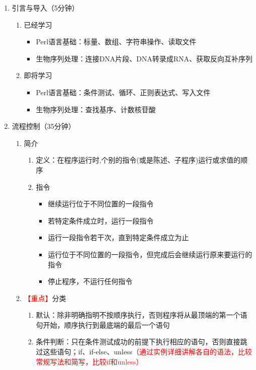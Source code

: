 \documentclass{TIJMUjiaoanLL}
\begin{document}
\begin{enumerate}
  \item 引言与导入（5分钟）
    \begin{enumerate}
      \item 已经学习
	\begin{itemize}
	  \item Perl语言基础：标量、数组、字符串操作、读取文件
	  \item 生物序列处理：连接DNA片段、DNA转录成RNA、获取反向互补序列
	\end{itemize}
      \item 即将学习
	\begin{itemize}
	  \item Perl语言基础：条件测试、循环、正则表达式、写入文件
	  \item 生物序列处理：查找基序、计数核苷酸
	\end{itemize}
    \end{enumerate}
  \item 流程控制（35分钟）
    \begin{enumerate}
      \item 简介
	\begin{enumerate}
	  \item 定义：在程序运行时,个别的指令(或是陈述、子程序)运行或求值的顺序
	  \item 指令
	    \begin{itemize}
	      \item 继续运行位于不同位置的一段指令
	      \item 若特定条件成立时，运行一段指令
	      \item 运行一段指令若干次，直到特定条件成立为止
	      \item 运行位于不同位置的一段指令，但完成后会继续运行原来要运行的指令
	      \item 停止程序，不运行任何指令
	    \end{itemize}
	\end{enumerate}
      \item \textcolor{red}{【重点】}分类
	\begin{enumerate}
	  \item 默认：除非明确指明不按顺序执行，否则程序将从最顶端的第一个语句开始，顺序执行到最底端的最后一个语句
	  \item 条件判断：只在条件测试成功的前提下执行相应的语句，否则直接跳过这些语句；if、if-else、unless\textcolor{red}{（通过实例详细讲解各自的语法，比较常规写法和简写，比较if和unless）}
	    \begin{itemize}

\end{itemize}
\end{enumerate}
\end{enumerate}
\end{enumerate}
\end{document}
